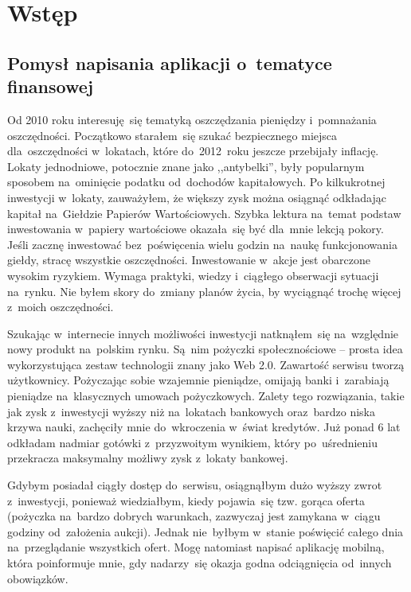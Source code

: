 \documentclass[a4paper,twoside,titlepage,openright]{book}
\begin{document}
\chapter*{Wstęp}

\section*{Pomysł napisania aplikacji o~tematyce finansowej}

Od 2010 roku interesuję~się tematyką oszczędzania pieniędzy i~pomnażania oszczędności. Początkowo starałem~się szukać bezpiecznego miejsca dla~oszczędności w~lokatach, które do~2012~roku jeszcze przebijały inflację. Lokaty jednodniowe, potocznie znane jako ,,antybelki'', były popularnym sposobem na~ominięcie podatku od~dochodów kapitałowych. Po kilkukrotnej inwestycji w~lokaty, zauważyłem, że większy zysk można osiągnąć odkładając kapitał na~Giełdzie Papierów Wartościowych. Szybka lektura na~temat podstaw inwestowania w~papiery wartościowe okazała~się być dla~mnie lekcją pokory. Jeśli zacznę inwestować bez~poświęcenia wielu godzin na~naukę funkcjonowania giełdy, stracę wszystkie oszczędności. Inwestowanie w~akcje jest obarczone wysokim ryzykiem. Wymaga praktyki, wiedzy i~ciągłego obserwacji sytuacji na~rynku. Nie byłem skory do~zmiany planów życia, by wyciągnąć trochę więcej z~moich oszczędności. 

Szukając w~internecie innych możliwości inwestycji natknąłem~się na~względnie nowy produkt na~polskim rynku. Są~nim pożyczki społecznościowe -- prosta idea wykorzystująca zestaw technologii znany jako Web 2.0. Zawartość serwisu tworzą użytkownicy. Pożyczając sobie wzajemnie pieniądze, omijają banki i~zarabiają pieniądze na~klasycznych umowach pożyczkowych. Zalety tego rozwiązania, takie jak zysk z~inwestycji wyższy niż na~lokatach bankowych oraz~bardzo niska krzywa nauki, zachęciły mnie do~wkroczenia w~świat kredytów. Już ponad 6 lat odkładam nadmiar gotówki z~przyzwoitym wynikiem, który po~uśrednieniu przekracza maksymalny możliwy zysk z~lokaty bankowej. 

Gdybym posiadał ciągły dostęp do~serwisu, osiągnąłbym dużo wyższy zwrot z~inwestycji, ponieważ wiedziałbym, kiedy pojawia~się tzw. gorąca oferta (pożyczka na~bardzo dobrych warunkach, zazwyczaj jest zamykana w~ciągu godziny od~założenia aukcji). Jednak nie~byłbym w~stanie poświęcić całego dnia na~przeglądanie wszystkich ofert. Mogę natomiast napisać aplikację mobilną, która poinformuje mnie, gdy nadarzy~się okazja godna odciągnięcia od~innych obowiązków. 
\end{document}
